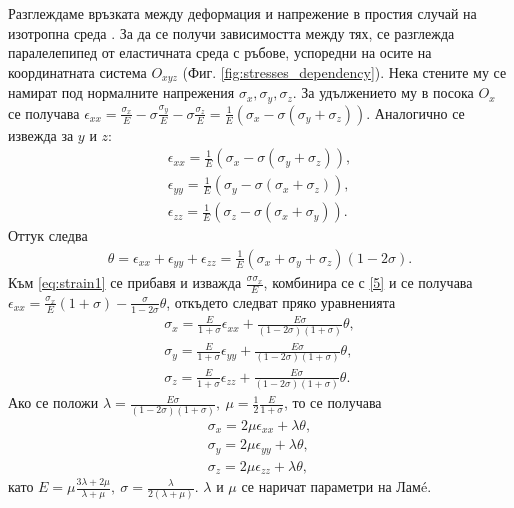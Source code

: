 \documentclass{report}
\begin{document}
	Разглеждаме връзката между деформация и напрежение в простия случай на изотропна среда \cite{geofizika_chast1}. За да се получи зависимостта между тях, се разглежда паралелепипед от еластичната среда с ръбове, успоредни на осите на координатната система $O_{xyz}$ (Фиг. \ref{fig:stresses_dependency}). Нека стените му се намират под нормалните напрежения $\sigma_x, \sigma_y, \sigma_z$. За удължението му в посока $O_x$ се получава $\displaystyle \epsilon_{xx}=\frac{\sigma_x}{E}-\sigma \frac{\sigma_y}{E}-\sigma \frac{\sigma_z}{E}= \frac{1}{E}(\sigma_x - \sigma (\sigma_y + \sigma_z))$. Аналогично се извежда за $y$ и $z$:
	\begin{align}
		\epsilon_{xx}= \frac{1}{E}(\sigma_x - \sigma (\sigma_y + \sigma_z)), \label{eq:strain1} \\
		\epsilon_{yy}= \frac{1}{E}(\sigma_y - \sigma (\sigma_x + \sigma_z)), \label{eq:strain2}\\
		\epsilon_{zz}= \frac{1}{E}(\sigma_z - \sigma (\sigma_x + \sigma_y)).\label{eq:strain3}
	\end{align}
	Оттук следва 
	\begin{align}
		\theta = \epsilon_{xx}+\epsilon_{yy}+\epsilon_{zz}= \frac{1}{E}(\sigma_x + \sigma_y + \sigma_z)(1 - 2\sigma) \label{5}.
	\end{align}
	Към \ref{eq:strain1} се прибавя и изважда $\displaystyle \frac{\sigma \sigma_x}{E}$, комбинира се с \ref{5} и се получава
	$\displaystyle \epsilon_{xx} = \frac{\sigma_x}{E}(1+\sigma)-\frac{\sigma}{1-2\sigma}\theta$, 
	откъдето следват пряко уравненията 
	\begin{align}
		\sigma_x = \frac{E}{1+\sigma}\epsilon_{xx} + \frac{E\sigma}{(1-2\sigma)(1+\sigma)}\theta,\label{eq:relation1}\\
		\sigma_y = \frac{E}{1+\sigma}\epsilon_{yy} + \frac{E\sigma}{(1-2\sigma)(1+\sigma)}\theta,\label{eq:stress5}\\
		\sigma_z = \frac{E}{1+\sigma}\epsilon_{zz} + \frac{E\sigma}{(1-2\sigma)(1+\sigma)}\theta.\label{eq:stress6}
	\end{align}
	Ако се положи $\displaystyle \lambda=\frac{E\sigma}{(1-2\sigma)(1+\sigma)},~ \mu = \frac{1}{2}\frac{E}{1+\sigma}$, то се получава
	\begin{align*}
		\sigma_x = 2\mu\epsilon_{xx} + \lambda\theta,\\ 
		\sigma_y = 2\mu\epsilon_{yy} + \lambda\theta,\\
		\sigma_z = 2\mu\epsilon_{zz} + \lambda\theta,
	\end{align*}
	като $\displaystyle E=\mu \frac{3\lambda+2\mu}{\lambda+\mu},~ \sigma=\frac{\lambda}{2(\lambda+\mu)}$. $\lambda$ и $\mu$ се наричат параметри на Ламé.
\end{document}
